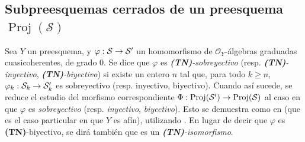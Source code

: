 \documentclass[oneside,10pt]{amsart}
\makeatletter
\renewcommand{\geq}{\geqslant}
\newcommand{\ega@arrow}[2]{\mathchoice{#1}{#2}{#2}{#2}}
\renewcommand{\to}{\ega@arrow{\longrightarrow}{\rightarrow}}
\let\EGAOriginalLabel\label
\renewcommand{\label}[1]{\phantomsection\EGAOriginalLabel{#1}}
\makeatother
\begin{document}

\subsection{Subpreesquemas cerrados de un preesquema $\operatorname{Proj}(\mathcal{S})$}
\label{subsection:II.3.6-fr}

\begin{env}[3.6.1]
\label{II.3.6.1-fr}
Sea $Y$ un preesquema, y $\varphi:\mathcal{S}\to\mathcal{S}'$ un homomorfismo de $\mathcal{O}_Y$-álgebras graduadas cuasicoherentes, de grado $0$.
Se dice que $\varphi$ es \emph{\textbf{(TN)}-sobreyectivo} (resp. \emph{\textbf{(TN)}-inyectivo}, \emph{\textbf{(TN)}-biyectivo}) si existe un entero $n$ tal que, para todo $k\geq n$, $\varphi_k:\mathcal{S}_k\to\mathcal{S}'_k$ es sobreyectivo (resp. inyectivo, biyectivo).
Cuando así sucede, se reduce el estudio del morfismo correspondiente $\Phi:\operatorname{Proj}(\mathcal{S}')\to\operatorname{Proj}(\mathcal{S})$ al caso en que $\varphi$ es \emph{sobreyectivo} (resp. \emph{inyectivo}, \emph{biyectivo}).
Esto se demuestra como en  (que es el caso particular en que $Y$ es afín), utilizando .
En lugar de decir que $\varphi$ es \textbf{(TN)}-biyectivo, se dirá también que es un \emph{\textbf{(TN)}-isomorfismo}.
\end{env}
\end{document}

